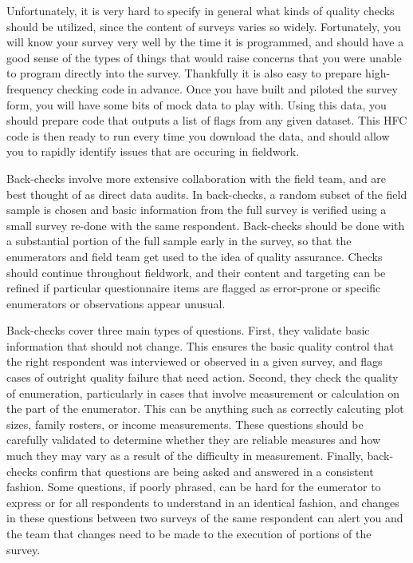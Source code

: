 Unfortunately, it is very hard to specify in general
what kinds of quality checks should be utilized,
since the content of surveys varies so widely.
Fortunately, you will know your survey very well
by the time it is programmed, and should have a good sense
of the types of things that would raise concerns
that you were unable to program directly into the survey.
Thankfully it is also easy to prepare high-frequency checking code in advance.
Once you have built and piloted the survey form,
you will have some bits of mock data to play with.
Using this data, you should prepare code that outputs
a list of flags from any given dataset.
This HFC code is then ready to run every time you download the data,
and should allow you to rapidly identify issues
that are occuring in fieldwork.

Back-checks
involve more extensive collaboration with the field team,
and are best thought of as direct data audits.
In back-checks, a random subset of the field sample is chosen
and basic information from the full survey is verified
using a small survey re-done with the same respondent.
Back-checks should be done with a substantial portion
of the full sample early in the survey,
so that the enumerators and field team
get used to the idea of quality assurance.
Checks should continue throughout fieldwork,
and their content and targeting can be refined if particular
questionnaire items are flagged as error-prone
or specific enumerators or observations appear unusual.

Back-checks cover three main types of questions.
First, they validate basic information that should not change.
This ensures the basic quality control that the right respondent
was interviewed or observed in a given survey,
and flags cases of outright quality failure that need action.
Second, they check the quality of enumeration,
particularly in cases that involve measurement or calculation
on the part of the enumerator.
This can be anything such as correctly calcuting plot sizes,
family rosters, or income measurements.
These questions should be carefully validated
to determine whether they are reliable measures
and how much they may vary as a result of the difficulty in measurement.
Finally, back-checks confirm that questions are being asked and answered
in a consistent fashion. Some questions, if poorly phrased,
can be hard for the eumerator to express or for all respondents
to understand in an identical fashion,
and changes in these questions between two surveys of the same respondent
can alert you and the team that changes need to be made
to the execution of portions of the survey.

